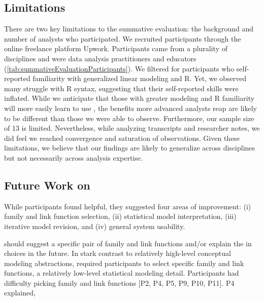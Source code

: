 
\subsection{Limitations}
There are two key limitations to the summative evaluation: the background and
number of analysts who participated. We recruited participants through the
online freelance platform Upwork. Participants came from a plurality of
disciplines and were data analysis practitioners and educators
(\autoref{tab:summativeEvaluationParticipants}). We filtered for participants
who self-reported familiarity with generalized linear modeling and R. Yet, we
observed many struggle with R syntax, suggesting that their self-reported skills
were inflated. While we anticipate that those with greater modeling and R
familiarity will more easily learn to use \rTisane, the benefits more advanced
analysts reap are likely to be different than those we were able to observe. 
Furthermore, our sample size of 13 is limited. Nevertheless, while analyzing
transcripts and researcher notes, we did feel we reached convergence and
saturation of observations. Given these limitations, we believe that our findings
are likely to generalize across disciplines but not necessarily across analysis
expertise. 


\subsection{Future Work on \rTisane}
While participants found \rTisane helpful, they suggested four areas of
improvement: (i) family and link function selection, (ii) statistical model
interpretation, (iii) iterative model revision, and (iv) general system
usability. 

\rTisane should suggest a specific pair of family and link functions
and/or explain the  in choices in the future. 
In stark contrast to \rTisanes relatively high-level conceptual modeling
abstractions, \rTisane required participants to select specific family and link
functions, a relatively low-level statistical modeling detail. Participants had
difficulty picking family and link functions [P2, P4, P5, P9, P10, P11]. P4
explained, 


